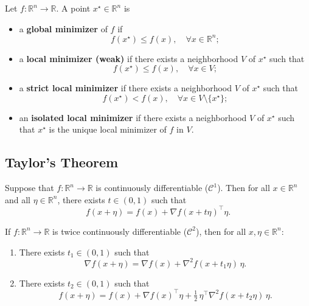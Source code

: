 \begin{definition}
Let $f : \mathbb{R}^n \to \mathbb{R}$. A point $x^\star \in \mathbb{R}^n$ is
\begin{itemize}
    \item a \textbf{global minimizer} of $f$ if
    \[
        f(x^\star) \leq f(x), \quad \forall x \in \mathbb{R}^n ;
    \]
    \item a \textbf{local minimizer (weak)} if there exists a neighborhood $V$ of $x^\star$
    such that
    \[
        f(x^\star) \leq f(x), \quad \forall x \in V ;
    \]
    \item a \textbf{strict local minimizer} if there exists a neighborhood $V$ of $x^\star$
    such that
    \[
        f(x^\star) < f(x), \quad \forall x \in V \setminus \{x^\star\} ;
    \]
    \item an \textbf{isolated local minimizer} if there exists a neighborhood $V$ of $x^\star$
    such that $x^\star$ is the unique local minimizer of $f$ in $V$.
\end{itemize}
\end{definition}

\subsection{Taylor's Theorem}
\label{subsec:2.2.1}

\begin{theoreme}
\label{thm:MVT}
Suppose that $f : \mathbb{R}^n \to \mathbb{R}$ is continuously differentiable ($\mathcal{C}^1$).
Then for all $x \in \mathbb{R}^n$ and all $\eta \in \mathbb{R}^n$, there exists
$t \in (0,1)$ such that
\begin{equation}
    f(x+\eta) = f(x) + \nabla f(x+t\eta)^\top \eta.
\end{equation}
\end{theoreme}



\begin{theoreme}
\label{thm:Taylor}
If $f : \mathbb{R}^n \to \mathbb{R}$ is twice continuously differentiable ($\mathcal{C}^2$), then for all
$x,\eta \in \mathbb{R}^n$:
\begin{enumerate}
    \item There exists $t_1 \in (0,1)$ such that
    \[
        \nabla f(x + \eta) = \nabla f(x) + \nabla^2 f(x + t_1\eta)\,\eta.
    \]
    \item There exists $t_2 \in (0,1)$ such that
    \[
        f(x + \eta) = f(x) + \nabla f(x)^\top \eta + \tfrac{1}{2}\,\eta^\top \nabla^2 f(x + t_2\eta)\,\eta.
    \]
\end{enumerate}
\end{theoreme}

